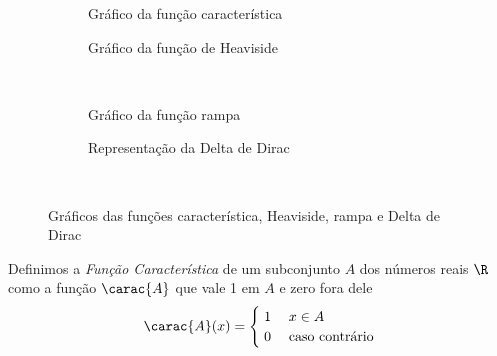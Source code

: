 \begin{figure}
  \centering
  \begin{subfigure}[b]{0.5\linewidth}
    \centering
    
    \caption{Gráfico da função característica}
    \label{fig:functions_carac}
  \end{subfigure}%
  \begin{subfigure}[b]{0.5\linewidth}
    \centering
    
    \caption{Gráfico da função de Heaviside}
    \label{fig:functions_heaviside}
  \end{subfigure}\\[0.5\baselineskip]
  \begin{subfigure}[b]{0.5\linewidth}
    \centering
    
    \caption{Gráfico da função rampa}
    \label{fig:functions_rampa}
  \end{subfigure}%
  \begin{subfigure}[b]{0.5\linewidth}
    \centering
    
    \caption{Representação da Delta de Dirac}
    \label{fig:functions_delta}
  \end{subfigure}\\[0.5\baselineskip]
  \caption{Gráficos das funções característica, Heaviside, rampa e Delta de Dirac}
  \label{fig:functions_other}
\end{figure}

Definimos a \emph{Função Característica}
de um subconjunto $A$ dos números reais $\R$ como a função $\carac{A}$ que vale 1
em $A$ e zero fora dele
\begin{equation}
  \label{eq:funcao_caracteristica}
  \carac{A}(x) = \begin{cases}
    \; 1 & \; x \in A \\
    \; 0 & \; \text{caso contrário}
  \end{cases}
\end{equation}

